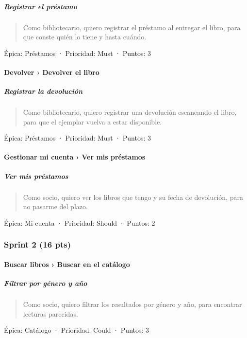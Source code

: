 \subparagraph*{Registrar el préstamo}

\begin{quote}
Como bibliotecario, quiero registrar el préstamo al entregar el libro, para que conste quién lo tiene y hasta cuándo.
\end{quote}

Épica: Préstamos · Prioridad: Must · Puntos: 3

\paragraph*{Devolver › Devolver el libro}

\subparagraph*{Registrar la devolución}

\begin{quote}
Como bibliotecario, quiero registrar una devolución escaneando el libro, para que el ejemplar vuelva a estar disponible.
\end{quote}

Épica: Préstamos · Prioridad: Must · Puntos: 3

\paragraph*{Gestionar mi cuenta › Ver mis préstamos}

\subparagraph*{Ver mis préstamos}

\begin{quote}
Como socio, quiero ver los libros que tengo y su fecha de devolución, para no pasarme del plazo.
\end{quote}

Épica: Mi cuenta · Prioridad: Should · Puntos: 2

\subsubsection*{Sprint 2 (16 pts)}

\paragraph*{Buscar libros › Buscar en el catálogo}

\subparagraph*{Filtrar por género y año}

\begin{quote}
Como socio, quiero filtrar los resultados por género y año, para encontrar lecturas parecidas.
\end{quote}

Épica: Catálogo · Prioridad: Could · Puntos: 3

